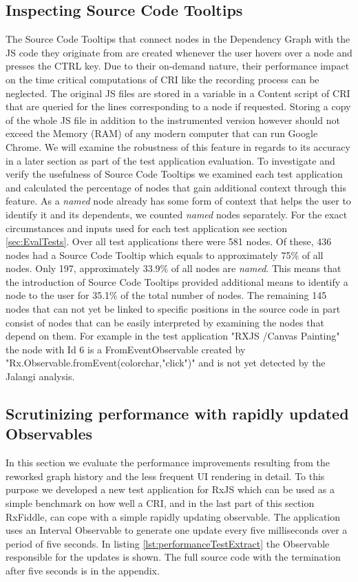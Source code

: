 	\subsection{Inspecting Source Code Tooltips}
	The Source Code Tooltips that connect nodes in the Dependency Graph with the JS code they originate from are created whenever the user hovers over a node and presses the CTRL key. Due to their on-demand nature, their performance impact on the time critical computations of CRI like the recording process can be neglected. The original JS files are stored in a variable in a Content script of CRI that are queried for the lines corresponding to a node if requested. Storing a copy of the whole JS file in addition to the instrumented version however should not exceed the Memory (RAM) of any modern computer that can run Google Chrome. We will examine the robustness of this feature in regards to its accuracy in a later section as part of the test application evaluation. To investigate and verify the usefulness of Source Code Tooltips we examined each test application and calculated the percentage of nodes that gain additional context through this feature. As a \emph{named} node already has some form of context that helps the user to identify it and its dependents, we counted \emph{named} nodes separately. For the exact circumstances and inputs used for each test application see section \ref{sec:EvalTests}. Over all test applications there were 581 nodes. Of these, 436 nodes had a Source Code Tooltip which equals to approximately 75\% of all nodes. Only 197, approximately 33.9\% of all nodes are \emph{named}. This means that the introduction of Source Code Tooltips provided additional means to identify a node to the user for 35.1\% of the total number of nodes. The remaining 145 nodes that can not yet be linked to specific positions in the source code in part consist of nodes that can be easily interpreted by examining the nodes that depend on them. For example in the test application "RXJS /Canvas Painting" %
	the node with Id 6 is a FromEventObservable created by "Rx.Observable.fromEvent(colorchar,"click")" and is not yet detected by the Jalangi analysis.

	\subsection{Scrutinizing performance with rapidly updated Observables}
	\label{sec:PerformanceEvaluation}
	In this section we evaluate the performance improvements resulting from the reworked graph history and the less frequent UI rendering in detail. To this purpose we developed a new test application for RxJS which can be used as a simple benchmark on how well a CRI, and in the last part of this section RxFiddle, can cope with a simple rapidly updating observable. The application uses an Interval Observable to generate one update every five milliseconds over a period of five seconds. In listing \ref{lst:performanceTestExtract} the Observable responsible for the updates is shown. The full source code with the termination after five seconds is in the appendix. %
	
